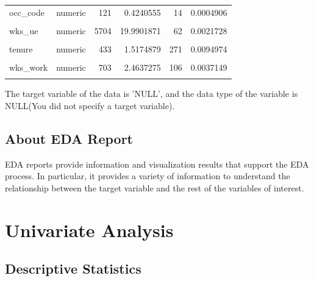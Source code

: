 \documentclass{book}\usepackage[]{graphicx}\usepackage[]{color}
\makeatletter
\newenvironment{kframe}{%
 \def\at@end@of@kframe{}%
 \ifinner\ifhmode%
  \def\at@end@of@kframe{\end{minipage}}%
  \begin{minipage}{\columnwidth}%
 \fi\fi%
 \def\FrameCommand##1{\hskip\@totalleftmargin \hskip-\fboxsep
 \colorbox{shadecolor}{##1}\hskip-\fboxsep
     \hskip-\linewidth \hskip-\@totalleftmargin \hskip\columnwidth}%
 \MakeFramed {\advance\hsize-\width
   \@totalleftmargin\z@ \linewidth\hsize
   \@setminipage}}%
 {\par\unskip\endMakeFramed%
 \at@end@of@kframe}
\makeatother
\begin{document}
\begin{table}[!h]
\begin{tabular}[t]{llrrrr}
occ\_code & numeric & 121 & 0.4240555 & 14 & 0.0004906\\
\cellcolor{gray!6}{union} & \cellcolor{gray!6}{numeric} & \cellcolor{gray!6}{9296} & \cellcolor{gray!6}{32.5786781} & \cellcolor{gray!6}{3} & \cellcolor{gray!6}{0.0001051}\\
\addlinespace
wks\_ue & numeric & 5704 & 19.9901871 & 62 & 0.0021728\\
\cellcolor{gray!6}{ttl\_exp} & \cellcolor{gray!6}{numeric} & \cellcolor{gray!6}{0} & \cellcolor{gray!6}{0.0000000} & \cellcolor{gray!6}{4744} & \cellcolor{gray!6}{0.1662578}\\
tenure & numeric & 433 & 1.5174879 & 271 & 0.0094974\\
\cellcolor{gray!6}{hours} & \cellcolor{gray!6}{numeric} & \cellcolor{gray!6}{67} & \cellcolor{gray!6}{0.2348076} & \cellcolor{gray!6}{86} & \cellcolor{gray!6}{0.0030139}\\
wks\_work & numeric & 703 & 2.4637275 & 106 & 0.0037149\\
\addlinespace
\cellcolor{gray!6}{ln\_wage} & \cellcolor{gray!6}{numeric} & \cellcolor{gray!6}{0} & \cellcolor{gray!6}{0.0000000} & \cellcolor{gray!6}{8173} & \cellcolor{gray!6}{0.2864302}\\
\bottomrule
\end{tabular}
\end{table}

The target variable of the data is 'NULL', and the data type of the variable is NULL(You did not specify a target variable).

\section{About EDA Report}
EDA reports provide information and visualization results that support the EDA process. In particular, it provides a variety of information to understand the relationship between the target variable and the rest of the variables of interest.

\chapter{Univariate Analysis}
\section{Descriptive Statistics}

\begin{kframe}


{\ttfamily\noindent\bfseries\color{errorcolor}{Error in proxy[i, ..., drop = FALSE]: incorrect number of dimensions}}

{\ttfamily\noindent\bfseries{}}\end{kframe}
\end{document}
